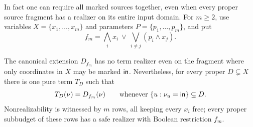 In fact one can require all marked sources together, even when every
proper source fragment has a realizer on its entire input domain.
For $m\geq2$, use variables $X=\{x_1,\ldots,x_m\}$ and parameters
$P=\{p_1,\ldots,p_m\}$, and put
\begin{equation}\label{core:eq:marked-obstruction-family}
 f_m=\bigwedge_i x_i\ \vee\ \bigvee_{i\ne j}(p_i\wedge x_j).
\end{equation}

\begin{theorem}
\label{core:thm:proper-marked-fragments}
The canonical extension $D_{f_m}$ has no term realizer even on the fragment
where only coordinates in $X$ may be marked $\mathsf{in}$. Nevertheless, for
every proper $D\subsetneq X$ there is one pure term $T_D$ such that
\[
 T_D(\nu)=D_{f_m}(\nu)\qquad
 \text{whenever }\{u:\nu_u=\mathsf{in}\}\subseteq D.
\]
Nonrealizability is witnessed by $m$ rows, all keeping every $x_i$ free;
every proper subbudget of these rows has a safe realizer with Boolean
restriction $f_m$.
\end{theorem}
